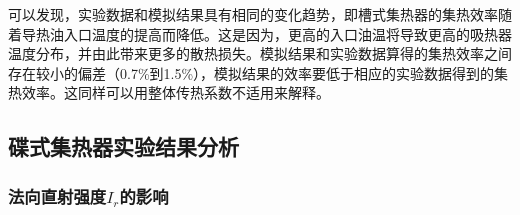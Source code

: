 可以发现，实验数据和模拟结果具有相同的变化趋势，即槽式集热器的集热效率随着导热油入口温度的提高而降低。这是因为，更高的入口油温将导致更高的吸热器温度分布，并由此带来更多的散热损失。模拟结果和实验数据算得的集热效率之间存在较小的偏差（0.7\%到1.5\%），模拟结果的效率要低于相应的实验数据得到的集热效率。这同样可以用整体传热系数不适用来解释。

\subsection{碟式集热器实验结果分析}
\subsubsection{法向直射强度$I_r$的影响}

